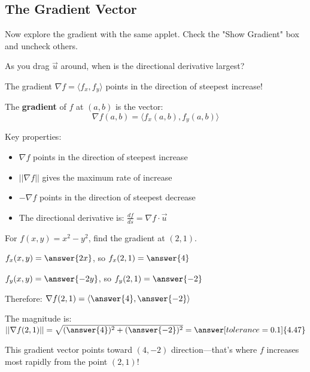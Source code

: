 \documentclass{ximera}
\begin{document}
\subsection*{The Gradient Vector}

\begin{problem}
Now explore the gradient with the same applet. Check the "Show Gradient" box and uncheck others.

\begin{center}
\end{center}

As you drag $\vec{u}$ around, when is the directional derivative largest?

\begin{multipleChoice}
\end{multipleChoice}

\begin{feedback}
The gradient $\nabla f = \langle f_x, f_y \rangle$ points in the direction of steepest increase!
\end{feedback}
\end{problem}

\begin{definition}
The \textbf{gradient} of $f$ at $(a, b)$ is the vector:
$$\nabla f(a, b) = \langle f_x(a, b), f_y(a, b) \rangle$$

Key properties:
\begin{itemize}
    \item $\nabla f$ points in the direction of steepest increase
    \item $||\nabla f||$ gives the maximum rate of increase
    \item $-\nabla f$ points in the direction of steepest decrease
    \item The directional derivative is: $\frac{df}{ds} = \nabla f \cdot \vec{u}$
\end{itemize}
\end{definition}

\begin{problem}
For $f(x, y) = x^2 - y^2$, find the gradient at $(2, 1)$.

$f_x(x, y) = \answer{2x}$, so $f_x(2, 1) = \answer{4}$

$f_y(x, y) = \answer{-2y}$, so $f_y(2, 1) = \answer{-2}$

Therefore: $\nabla f(2, 1) = \langle \answer{4}, \answer{-2} \rangle$

The magnitude is: $||\nabla f(2, 1)|| = \sqrt{(\answer{4})^2 + (\answer{-2})^2} = \answer[tolerance=0.1]{4.47}$

\begin{feedback}
This gradient vector points toward $(4, -2)$ direction—that's where $f$ increases most rapidly from the point $(2, 1)$!
\end{feedback}
\end{problem}
\end{document}
